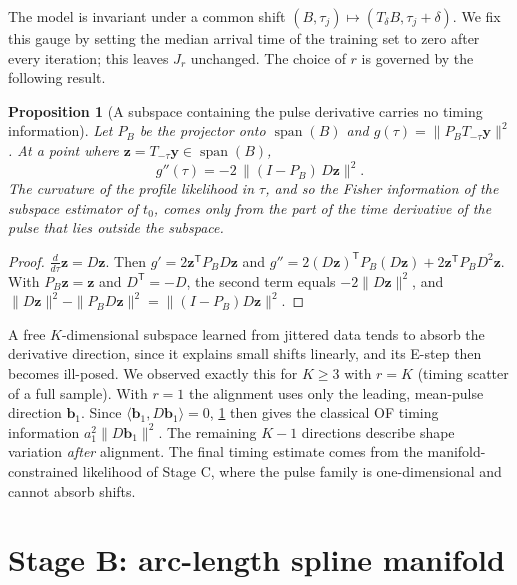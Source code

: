 \documentclass[aps,prapplied,reprint,superscriptaddress,longbibliography,nofootinbib]{revtex4-2}
\newtheorem{proposition}{Proposition}
\theoremstyle{remark}
\newcommand{\T}{\mathsf{T}}
\newcommand{\vect}[1]{\bm{#1}}
\newcommand{\Sh}[1]{T_{#1}}
\begin{document}
The model is invariant under a common shift
$(B,\tau_j)\mapsto(\Sh{\delta}B,\tau_j+\delta)$. We fix this gauge by setting the
median arrival time of the training set to zero after every iteration; this leaves
$J_r$ unchanged. The choice of $r$ is governed by the following result.

\begin{proposition}[A subspace containing the pulse derivative carries no timing
information]\label{prop:derivative}
Let $P_B$ be the projector onto $\operatorname{span}(B)$ and $g(\tau)=\|P_B
\Sh{-\tau}\vect y\|^2$. At a point where $\vect z=\Sh{-\tau}\vect y\in
\operatorname{span}(B)$,
\begin{equation}
g''(\tau) = -2\,\|(I-P_B)\,D\vect z\|^2 .
\end{equation}
The curvature of the profile likelihood in $\tau$, and so the Fisher information
of the subspace estimator of $t_0$, comes only from the part of the time
derivative of the pulse that lies \emph{outside} the subspace.
\end{proposition}
\begin{proof}
$\frac{d}{d\tau}\vect z=D\vect z$. Then
$g'=2\vect z^\T P_BD\vect z$ and
$g''=2(D\vect z)^\T P_B(D\vect z)+2\vect z^\T P_BD^2\vect z$. With $P_B\vect z=\vect z$
and $D^\T=-D$, the second term equals $-2\|D\vect z\|^2$, and
$\|D\vect z\|^2-\|P_BD\vect z\|^2=\|(I-P_B)D\vect z\|^2$.
\end{proof}
A free $K$-dimensional subspace learned from jittered data tends to absorb the
derivative direction, since it explains small shifts linearly, and its E-step then
becomes ill-posed. We observed exactly this for $K\ge3$ with $r=K$ (timing
scatter of a full sample). With $r=1$ the alignment uses only the leading,
mean-pulse direction $\vect b_1$. Since $\langle\vect b_1,D\vect b_1\rangle=0$,
\cref{prop:derivative} then gives the classical OF timing information
$a_1^2\|D\vect b_1\|^2$. The remaining $K-1$ directions describe shape variation
\emph{after} alignment. The final timing estimate comes from the manifold-constrained
likelihood of Stage C, where the pulse family is one-dimensional and cannot absorb
shifts.

\section{Stage B: arc-length spline manifold}
\label{sec:stageB}
\end{document}
